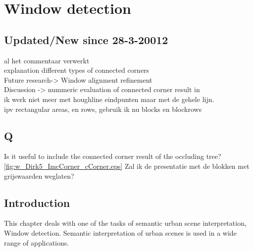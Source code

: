 


% 



%
%




\section{Window detection}
\subsection{Updated/New since 28-3-20012}
al het commentaar verwerkt\\
explanation different types of connected corners\\
Future research-> Window alignment refinement\\
Discussion -> nummeric evaluation of connected corner result in \\
ik werk niet meer met houghline eindpunten maar met de gehele lijn.\\
ipv rectangular areas, en rows, gebruik ik nu blocks en blockrows\\

\subsection{Q}
Is it useful to include the connected corner result of the occluding tree?
\ref{fig:w_Dirk5_ImcCorner_cCorner.eps}
Zal ik de presentatie met de blokken met grijswaarden weglaten?

\label{chap:windowDetection}
\subsection{Introduction}
This chapter deals with one of the tasks of semantic urban scene interpretation, Window detection. 
Semantic interpretation of urban scenes is used in a wide range of applications.

